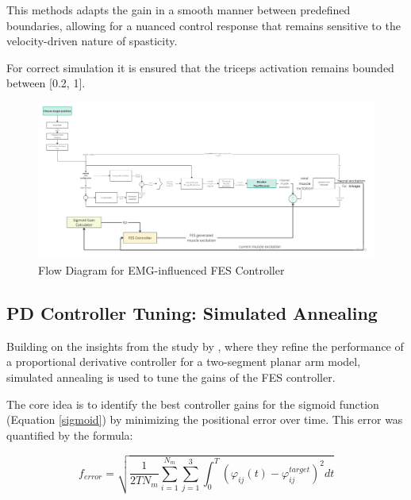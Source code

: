 This methods adapts the gain in a smooth manner between predefined boundaries, allowing for a nuanced control response that remains sensitive to the velocity-driven nature of spasticity.

For correct simulation it is ensured that the triceps activation remains bounded between [0.2, 1]. 


\newpage
\begin{landscape} %
  \begin{figure}[h!]
    \centering
    \includegraphics[width=1.7\textwidth]{Pictures/Controller/FESController.jpg} %
    \caption{Flow Diagram for EMG-influenced FES Controller} %
    \label{fig:FESController} %
  \end{figure}
\end{landscape} %

\subsection{PD Controller Tuning: Simulated Annealing}


Building on the insights from the study by \cite{PDP}, where they refine the performance of a proportional derivative controller for a two-segment planar arm model, simulated annealing is used to tune the gains of the FES controller. 

The core idea is to identify the best controller gains for the sigmoid function (Equation \ref{sigmoid}) by minimizing the positional error over time. This error was quantified by the formula:

\begin{equation}
f_{error} = \sqrt{\frac{1}{2TN_m}\sum_{i=1}^{N_m}\sum_{j=1}^{3}\int_{0}^{T}(\varphi_{ij}(t)-\varphi_{ij}^{target})^2 dt}
\end{equation}

